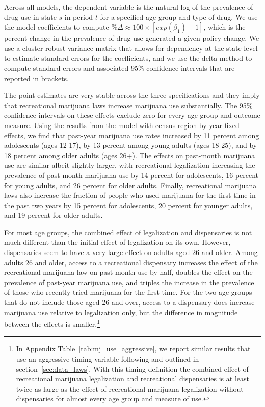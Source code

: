 \documentclass[12pt]{article}%
\begin{document}
Across all models, the dependent variable is the natural log of the prevalence of drug use in state $s$ in period $t$ for a specified age group and type of drug. We use the model coefficients to compute $\% \Delta \approx 100\times \left[exp(\beta_1)-1\right]$, which is the percent change in the prevalence of drug use generated a given policy change.  We use a cluster robust variance matrix that allows for dependency at the state level to estimate standard errors for the coefficients, and we use the delta method to compute standard errors and associated 95\% confidence intervals that are reported in brackets. 

The point estimates are very stable across the three specifications and they imply that recreational marijuana laws increase marijuana use substantially. The 95\% confidence intervals on these effects exclude zero for every age group and outcome measure. 
Using the results from the model with census region-by-year fixed effects, we find that past-year marijuana use rates increased by 11 percent among adolescents (ages 12-17), by 13 percent among young adults (ages 18-25), and by 18 percent among older adults (ages 26+). The effects on past-month marijuana use are similar albeit slightly larger, with recreational legalization increasing the prevalence of past-month marijuana use by 14 percent for adolescents, 16 percent for young adults, and 26 percent for older adults. Finally, recreational marijuana laws also increase the fraction of people who used marijuana for the first time in the past two years by 15 percent for adolescents, 20 percent for younger adults, and 19 percent for older adults.

For most age groups, the combined effect of legalization and dispensaries is not much different than the initial effect of legalization on its own. However, dispensaries seem to have a very large effect on adults aged 26 and older. Among adults 26 and older, access to a recreational dispensary increases the effect of the recreational marijuana law on past-month use by half, doubles the effect on the prevalence of past-year marijuana use, and triples the increase in the prevalence of those who recently tried marijuana for the first time. For the two age groups that do not include those aged 26 and over, access to a dispensary does increase marijuana use relative to legalization only, but the difference in magnitude between the effects is smaller.\footnote{In Appendix Table~\ref{tab:mj_use_aggressive}, we report similar results that use an aggressive timing variable following \citet{Friedman2015} and outlined in section~\ref{sec:data_laws}. With this timing definition the combined effect of recreational marijuana legalization and recreational dispensaries is at least twice as large as the effect of recreational marijuana legalization without dispensaries for almost every age group and measure of use.}
\end{document}
